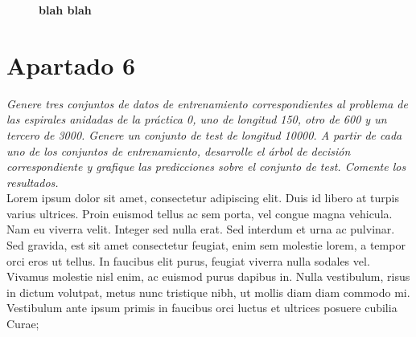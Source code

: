 \documentclass[a4paper, 11pt]{article} %
\begin{document}
\begin{figure}
  \centering
  \caption*{\textbf{blah blah}}

\end{figure}


\section*{Apartado 6}  \textit{Genere tres conjuntos de datos de entrenamiento
correspondientes al problema de las espirales anidadas de la práctica 0, uno de
longitud 150, otro de 600 y un tercero de 3000. Genere un conjunto de test de
longitud 10000. A partir de cada uno de los conjuntos de entrenamiento,
desarrolle el árbol de decisión correspondiente y grafique las predicciones
sobre el conjunto de test. Comente los resultados.}\\

Lorem ipsum dolor sit amet, consectetur adipiscing elit. Duis id libero at
turpis varius ultrices. Proin euismod tellus ac sem porta, vel congue magna
vehicula. Nam eu viverra velit. Integer sed nulla erat. Sed interdum et urna ac
pulvinar. Sed gravida, est sit amet consectetur feugiat, enim sem molestie
lorem, a tempor orci eros ut tellus. In faucibus elit purus, feugiat viverra
nulla sodales vel. Vivamus molestie nisl enim, ac euismod purus dapibus in.
Nulla vestibulum, risus in dictum volutpat, metus nunc tristique nibh, ut
mollis diam diam commodo mi. Vestibulum ante ipsum primis in faucibus orci
luctus et ultrices posuere cubilia Curae; 
\end{document}
